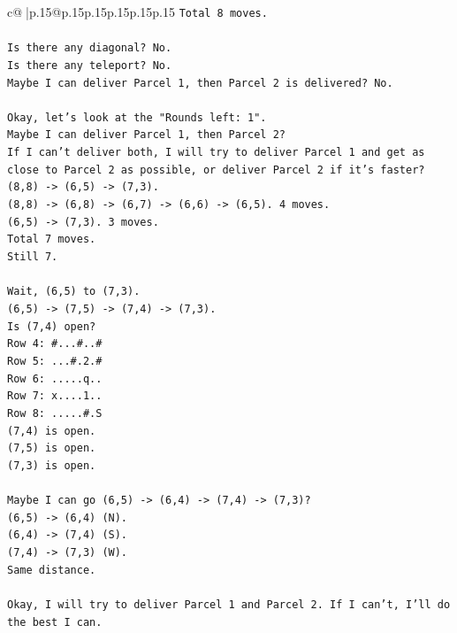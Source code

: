 \documentclass{article}
\begin{document}
{\begin{supertabular}{c@{$\;$}|p{.15\linewidth}@{}p{.15\linewidth}p{.15\linewidth}p{.15\linewidth}p{.15\linewidth}p{.15\linewidth}}
{{{\texttt{Total 8 moves.} \\
\\ 
\texttt{Is there any diagonal? No.} \\
\texttt{Is there any teleport? No.} \\
\texttt{Maybe I can deliver Parcel 1, then Parcel 2 is delivered? No.} \\
\\ 
\texttt{Okay, let's look at the "Rounds left: 1".} \\
\texttt{Maybe I can deliver Parcel 1, then Parcel 2?} \\
\texttt{If I can't deliver both, I will try to deliver Parcel 1 and get as close to Parcel 2 as possible, or deliver Parcel 2 if it's faster?} \\
\texttt{(8,8) {-}> (6,5) {-}> (7,3).} \\
\texttt{(8,8) {-}> (6,8) {-}> (6,7) {-}> (6,6) {-}> (6,5). 4 moves.} \\
\texttt{(6,5) {-}> (7,3). 3 moves.} \\
\texttt{Total 7 moves.} \\
\texttt{Still 7.} \\
\\ 
\texttt{Wait, (6,5) to (7,3).} \\
\texttt{(6,5) {-}> (7,5) {-}> (7,4) {-}> (7,3).} \\
\texttt{Is (7,4) open?} \\
\texttt{Row 4: \#...\#..\#} \\
\texttt{Row 5: ...\#.2.\#} \\
\texttt{Row 6: .....q..} \\
\texttt{Row 7: x....1..} \\
\texttt{Row 8: .....\#.S} \\
\texttt{(7,4) is open.} \\
\texttt{(7,5) is open.} \\
\texttt{(7,3) is open.} \\
\\ 
\texttt{Maybe I can go (6,5) {-}> (6,4) {-}> (7,4) {-}> (7,3)?} \\
\texttt{(6,5) {-}> (6,4) (N).} \\
\texttt{(6,4) {-}> (7,4) (S).} \\
\texttt{(7,4) {-}> (7,3) (W).} \\
\texttt{Same distance.} \\
\\ 
\texttt{Okay, I will try to deliver Parcel 1 and Parcel 2. If I can't, I'll do the best I can.} \\
}}}
\end{supertabular}}
\end{document}
